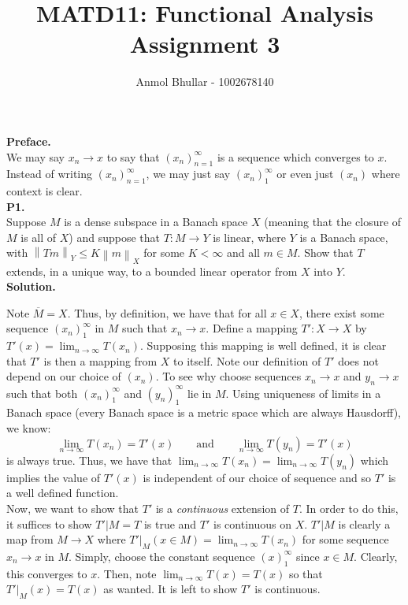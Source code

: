 \documentclass{article}
\title{MATD11: Functional Analysis\\
    Assignment 3}
\author{Anmol Bhullar - 1002678140}
\newcommand{\norm}[1]{\left\lVert#1\right\rVert}
\begin{document}
    \maketitle

    \textbf{Preface.}\\

    We may say $x_n\to x$ to say that $(x_n)_{n=1}^{\infty}$ is a sequence which converges to $x$. Instead of writing 
    $(x_n)_{n=1}^{\infty}$, we may just say $(x_n)_1^{\infty}$ or even just $(x_n)$ where context is clear.\\

    \textbf{P1.}\\

    Suppose $M$ is a dense subspace in a Banach space $X$ (meaning that the closure of $M$ is all of $X$) and suppose that
    $T:M\to Y$ is linear, where $Y$ is a Banach space, with $\norm{Tm}_Y \leq K\norm{m}_X$ for some $K<\infty$ and all $m\in M$.
    Show that $T$ extends, in a unique way, to a bounded linear operator from $X$ into $Y$.\\

    \textbf{Solution.}

    Note $\overline{M} = X$. Thus, by definition, we have that for all $x\in X$, there exist some sequence $(x_n)_1^{\infty}$ in $M$
    such that $x_n\to x$. Define a mapping $T': X\to X$ by $T'(x) = \lim_{n\to\infty} T(x_n)$. Supposing this mapping is well
    defined, it is clear that $T'$ is then a mapping from $X$ to itself. Note our definition of $T'$ does not depend on our choice
    of $(x_n)$. To see why choose sequences $x_n\to x$ and $y_n\to x$ such that both $(x_n)_1^{\infty}$ and $(y_n)_1^{\infty}$
    lie in $M$. Using uniqueness of limits in a Banach space (every Banach space is a metric space which are always Hausdorff),
    we know:
    \[ \lim_{n\to\infty} T(x_n) = T'(x)\qquad\text{and}\qquad\lim_{n\to\infty} T(y_n) = T'(x) \]
    is always true. Thus, we have that $\lim_{n\to\infty} T(x_n) = \lim_{n\to\infty} T(y_n)$ which implies the value of $T'(x)$
    is independent of our choice of sequence and so $T'$ is a well defined function.\\
    
    Now, we want to show that $T'$ is a \textit{continuous} extension of $T$. In order to do this, it suffices to show $T'|M = T$
    is true and $T'$ is continuous on $X$. $T'|M$ is clearly a map from $M\to X$ where $T'|_M(x\in M) = \lim_{n\to\infty} T(x_n)$ for
    some sequence $x_n\to x$ in $M$. Simply, choose the constant sequence $(x)_1^{\infty}$ since $x\in M$.  Clearly, this converges to
    $x$. Then, note $\lim_{n\to\infty} T(x) = T(x)$ so that $T'|_M(x) = T(x)$ as wanted. It is left to show $T'$ is continuous.\\
\end{document}
